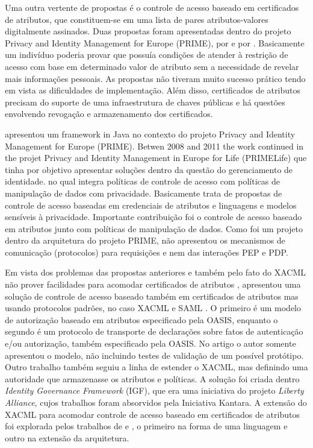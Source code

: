 \documentclass{doublecol-new}
\begin{document}
Uma outra vertente de propostas é o controle de acesso baseado em certificados de atributos, que constituem-se em uma lista de pares atributos-valores digitalmente assinados. Duas propostas foram apresentadas dentro do projeto Privacy and Identity Management for Europe (PRIME), por \citep{ardagna2008privacy} e por \citep{ardagna2010exploiting}. Basicamente um indivíduo poderia provar que possuía condições de atender à restrição de acesso com base em determinado valor de atributo sem a necessidade de revelar mais informações pessoais. As propostas não tiveram muito sucesso prático tendo em vista as dificuldades de implementação. Além disso, certificados de atributos precisam do suporte de uma infraestrutura de chaves públicas e há questões envolvendo revogação e armazenamento dos certificados.

\cite{ardagna2008privacy} apresentou um framework in Java no contexto do projeto Privacy and Identity Management for Europe (PRIME). Betwen 2008 and 2011 the work continued in the projet Privacy and Identity Management in Europe for Life (PRIMELife) que tinha por objetivo apresentar soluções dentro da questão do gerenciamento de identidade. no qual integra políticas de controle de acesso com políticas de manipulação de dados com privacidade. Basicamente trata de propostas de controle de acesso baseadas em credenciais de atributos e linguagens e modelos sensíveis à privacidade. Importante contribuição foi o controle de acesso baseado em atributos junto com políticas de manipulação de dados. Como foi um projeto dentro da arquitetura do projeto PRIME, não apresentou os mecanismos de comunicação (protocolos) para requisições e nem das interações PEP e PDP.



Em vista dos problemas das propostas anteriores e também pelo fato do XACML não prover facilidades para acomodar certificados de atributos \citep{dagdee2011extending}, \citep{ardagna2010enabling} apresentou uma solução de controle de acesso baseado também em certificados de atributos mas usando protocolos padrões, no caso XACML \citep{rissanen2013extensible} e SAML \citep{ragouzis2008security}. O primeiro é um modelo de autorização baseado em atributos especificado pela OASIS, enquanto o segundo é um protocolo de transporte de declarações sobre fatos de autenticação e/ou autorização, também especificado pela OASIS. No artigo o autor somente apresentou o modelo, não incluindo testes de validação de um possível protótipo. Outro trabalho \cite{kounga2010extending} também seguiu a linha de estender o XACML, mas definindo uma autoridade que armazenasse os atributos e políticas. A solução foi criada dentro \textit{Identity Governance Framework} (IGF), que era uma iniciativa do projeto \textit{Liberty Alliance}, cujos trabalhos foram absorvidos pela Iniciativa Kantara. A extensão do XACML para acomodar controle de acesso baseado em certificados de atributos foi explorada pelos trabalhos de  \cite{camenisch2009credential} e  \cite{dagdee2011extending}, o primeiro na forma de uma linguagem e outro na extensão da arquitetura.
\end{document}
